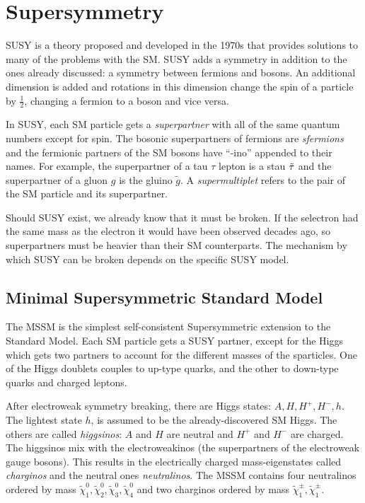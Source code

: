 

\section{Supersymmetry}

\acf{SUSY} is a theory proposed and developed in the 1970s \cite{susy-found-1,susy-found-2,susy-found-3} that provides solutions to many of the problems with the \ac{SM}. \ac{SUSY} adds a symmetry in addition to the ones already discussed: a symmetry between fermions and bosons. An additional dimension is added and rotations in this dimension change the spin of a particle by $\frac{1}{2}$, changing a fermion to a boson and vice versa. 

In \ac{SUSY}, each \ac{SM} particle gets a \emph{superpartner} with all of the same quantum numbers except for spin. The bosonic superpartners of fermions are \emph{sfermions} and the fermionic partners of the \ac{SM} bosons have ``-ino'' appended to their names. For example, the superpartner of a tau $\tau$ lepton is a stau $\tilde{\tau}$ and the superpartner of a gluon $g$ is the gluino $\tilde{g}$. A \emph{supermultiplet} refers to the pair of the \ac{SM} particle and its superpartner.

Should \ac{SUSY} exist, we already know that it must be broken. If the selectron had the same mass as the electron it would have been observed decades ago, so superpartners must be heavier than their \ac{SM} counterparts. The mechanism by which \ac{SUSY} can be broken depends on the specific \ac{SUSY} model.

\subsection{Minimal Supersymmetric Standard Model}

The \acf{MSSM} is the simplest self-consistent Supersymmetric extension to the Standard Model. Each \ac{SM} particle gets a \ac{SUSY} partner, except for the Higgs which gets two partners to account for the different masses of the sparticles. One of the Higgs doublets couples to up-type quarks, and the other to down-type quarks and charged leptons. 

After electroweak symmetry breaking, there are Higgs states: $A, H, H^{+}, H^{-}, h$. The lightest state $h$, is assumed to be the already-discovered \ac{SM} Higgs. The others are called \emph{higgsinos}: $A$ and $H$ are neutral and $H^{+}$ and $H^{-}$ are charged. The higgsinos mix with the electroweakinos (the superpartners of the electroweak gauge bosons). This results in the electrically charged mass-eigenstates called \emph{charginos} and the neutral ones \emph{neutralinos}. The \ac{MSSM} contains four neutralinos ordered by mass $\tilde{\chi}^{0}_{1}, \tilde{\chi}^{0}_{2}, \tilde{\chi}^{0}_{3}, \tilde{\chi}^{0}_{4}$ and two charginos ordered by mass $\tilde{\chi}^{\pm}_{1}, \tilde{\chi}^{\pm}_{1}$. 

